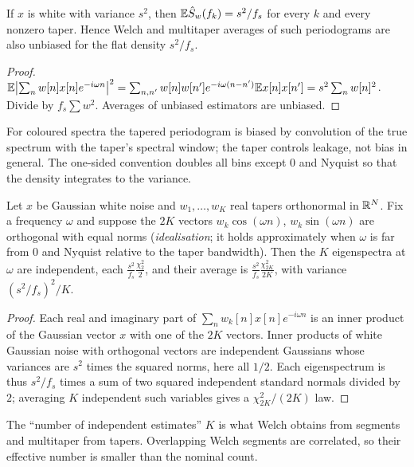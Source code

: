 \begin{theorem}\label{ars:spec-001}
If $x$ is white with variance $s^2$, then $\mathbb E\hat S_w(f_k)=s^2/f_s$ for every $k$ and every nonzero taper. Hence Welch and multitaper averages of such periodograms are also unbiased for the flat density $s^2/f_s$.
\end{theorem}
\begin{proof}
$\mathbb E\bigl|\sum_n w[n]x[n]e^{-i\omega n}\bigr|^2=\sum_{n,n'}w[n]w[n']e^{-i\omega(n-n')}\mathbb E x[n]x[n']=s^2\sum_n w[n]^2$. Divide by $f_s\sum w^2$. Averages of unbiased estimators are unbiased.
\end{proof}
For coloured spectra the tapered periodogram is biased by convolution of the true spectrum with the taper's spectral window; the taper controls leakage, not bias in general. The one-sided convention doubles all bins except $0$ and Nyquist so that the density integrates to the variance.

\begin{theorem}\label{ars:spec-002}
Let $x$ be Gaussian white noise and $w_1,\dots,w_K$ real tapers orthonormal in $\mathbb R^N$. Fix a frequency $\omega$ and suppose the $2K$ vectors $w_k\cos(\omega n)$, $w_k\sin(\omega n)$ are orthogonal with equal norms (\emph{idealisation}; it holds approximately when $\omega$ is far from $0$ and Nyquist relative to the taper bandwidth). Then the $K$ eigenspectra at $\omega$ are independent, each $\frac{s^2}{f_s}\frac{\chi^2_2}{2}$, and their average is $\frac{s^2}{f_s}\frac{\chi^2_{2K}}{2K}$, with variance $(s^2/f_s)^2/K$.
\end{theorem}
\begin{proof}
Each real and imaginary part of $\sum_nw_k[n]x[n]e^{-i\omega n}$ is an inner product of the Gaussian vector $x$ with one of the $2K$ vectors. Inner products of white Gaussian noise with orthogonal vectors are independent Gaussians whose variances are $s^2$ times the squared norms, here all $1/2$. Each eigenspectrum is thus $s^2/f_s$ times a sum of two squared independent standard normals divided by $2$; averaging $K$ independent such variables gives a $\chi^2_{2K}/(2K)$ law.
\end{proof}
The ``number of independent estimates'' $K$ is what Welch obtains from segments and multitaper from tapers. Overlapping Welch segments are correlated, so their effective number is smaller than the nominal count.

